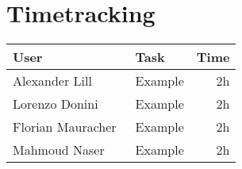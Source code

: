 \chapter{Timetracking}\label{chapter:timetracking}

\begin{table}[htpb]
  \centering
  \begin{tabularx}{\textwidth}{l X r}
    \toprule
      User & Task & Time \\
    \midrule
      Alexander Lill & Example & 2h \\
      Lorenzo Donini & Example & 2h \\
      Florian Mauracher\ & Example & 2h \\
      Mahmoud Naser & Example & 2h \\
    \bottomrule
  \end{tabularx}
\end{table}
